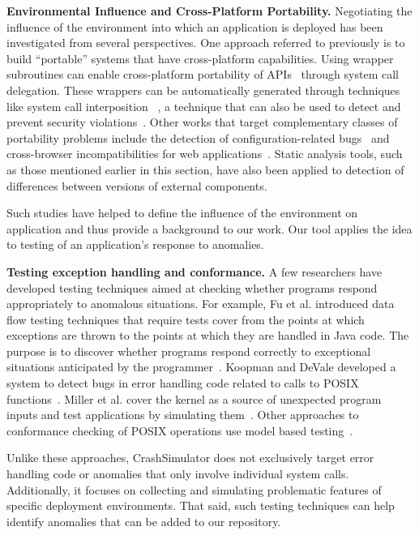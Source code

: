 \noindent
{\bf Environmental Influence and Cross-Platform Portability.}
Negotiating the influence of the environment into which an
application is deployed has been investigated from several
perspectives. One approach referred to previously
is to build ``portable'' systems
that have cross-platform capabilities.
Using wrapper subroutines
can enable cross-platform portability
of APIs~\cite{bartolomeicompliance} through system call delegation.
These wrappers can be automatically generated through techniques like
system call interposition ~\cite{Guo:2011:CUS:2002181.2002202}, a
technique that can also be used to detect and prevent security
violations~\cite{Hofmeyr:1998:IDU:1298081.1298084,
Acharya:2000:MUP:1251306.1251307}.
Other works that target complementary classes of portability problems
include the detection of configuration-related bugs~\cite{skoll:icse:2004,
Yilmaz:issta:2004, Fouche:issta:2009, Kastner12, Nguyen14} and
cross-browser incompatibilities for web
applications~\cite{DBLP:conf/icsm/ChoudharyVO10, silakov2010improving,
DBLP:conf/icse/Choudhary11, Mesbah:2011:ACC:1985793.1985870,
DBLP:conf/icst/DallmeierP0MZ14}.  Static analysis tools, such as those
mentioned earlier in this section, have also been applied to
detection of differences between versions of external components.

Such studies have helped to define the influence of the environment on
application and thus provide a background to our work.  Our tool applies
the idea to testing of an application's response to anomalies.

\noindent
{\bf Testing exception handling and conformance.}
A few researchers have developed testing techniques aimed at checking
whether programs respond appropriately to anomalous situations.  For
example, Fu et al. introduced data flow testing techniques that require
tests cover from the points at which exceptions are thrown to the points
at which they are handled in Java code. The purpose is to discover whether
programs respond correctly to exceptional situations anticipated by the
programmer~\cite{DBLP:journals/tse/FuMRW05}.  Koopman and DeVale developed
a system to detect bugs in error handling code related to calls to POSIX
functions~\cite{Koopman00theexception}.  Miller et al. cover the kernel as
a source of unexpected program inputs and test applications by simulating
them~\cite{murphyslaw}.
Other approaches to conformance checking of POSIX operations use model
based testing~\cite{Dadeau:2008:CSM:1433121.1433137,Farchi02}.

Unlike these approaches, CrashSimulator does not exclusively target error
handling code or anomalies that only involve individual system calls.
Additionally, it focuses on collecting and simulating
problematic features of specific
deployment environments.
That said, such testing techniques
can help identify anomalies that can be added to our repository.

